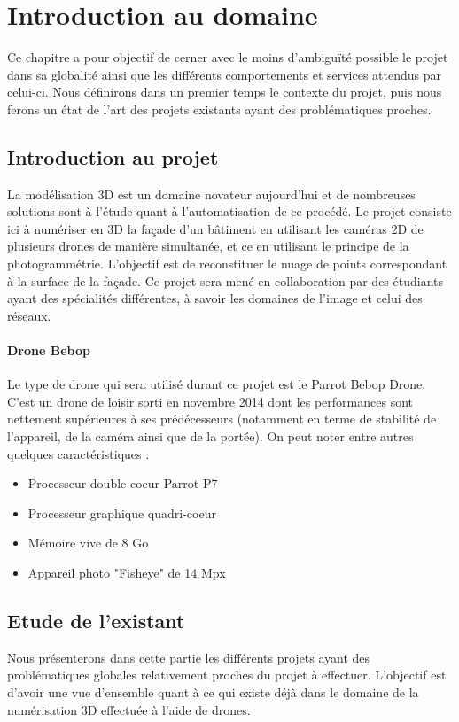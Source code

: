 \documentclass[12pt, openany]{report}
\begin{document}
\chapter{Introduction au domaine}
Ce chapitre a pour objectif de cerner avec le moins d'ambiguïté possible le projet dans sa globalité ainsi que les différents comportements et services attendus par celui-ci. Nous définirons dans un premier temps le contexte du projet, puis nous ferons un état de l'art des projets existants ayant des problématiques proches.


\section{Introduction au projet}
La modélisation 3D est un domaine novateur aujourd'hui et de nombreuses solutions sont à l'étude quant à l'automatisation de ce procédé. Le projet consiste ici à numériser en 3D la façade d'un bâtiment en utilisant les caméras 2D de plusieurs drones de manière simultanée, et ce en utilisant le principe de la photogrammétrie. L'objectif est de reconstituer le nuage de points correspondant à la surface de la façade.
Ce projet sera mené en collaboration par des étudiants ayant des spécialités différentes, à savoir les domaines de l'image et celui des réseaux.

\subsubsection{Drone Bebop}

Le type de drone qui sera utilisé durant ce projet est le Parrot Bebop Drone. C'est un drone de loisir sorti en novembre 2014 dont les performances sont nettement supérieures à ses prédécesseurs (notamment en terme de stabilité de l'appareil, de la caméra ainsi que de la portée). On peut noter entre autres quelques caractéristiques : 
\begin{itemize}
\item Processeur double coeur Parrot P7
\item Processeur graphique quadri-coeur
\item Mémoire vive de 8 Go
\item Appareil photo "Fisheye" de 14 Mpx
\end{itemize}

\section{Etude de l'existant}
Nous présenterons dans cette partie les différents projets ayant des problématiques globales relativement proches du projet à effectuer. L'objectif est d'avoir une vue d'ensemble quant à ce qui existe déjà dans le domaine de la numérisation 3D effectuée à l'aide de drones.
\end{document}
